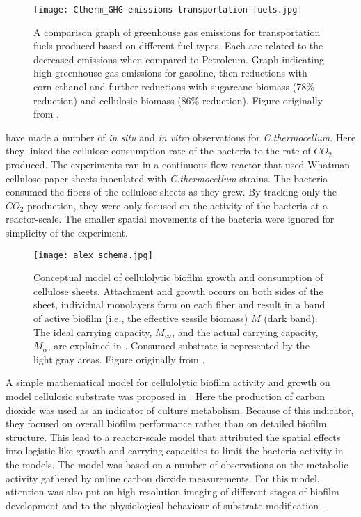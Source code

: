 \begin{figure}[!htp]
  \centering
  \texttt{[image: Ctherm\_GHG-emissions-transportation-fuels.jpg]}
  \caption{A comparison graph of greenhouse gas emissions for transportation fuels produced based on different fuel types.
    Each are related to the decreased emissions when compared to Petroleum.
    Graph indicating high greenhouse gas emissions for gasoline, then reductions with corn ethanol and further reductions with sugarcane biomass (78\% reduction) and cellulosic biomass (86\% reduction).
    Figure originally from \cite{afdc2007emission}.
  }
  \label{fig:emissions}
\end{figure}

\cite{dumitrache2015mathematicalModeling} have made a number of \textit{in situ} and \textit{in vitro} observations for \textit{C.thermocellum}.
Here they linked the cellulose consumption rate of the bacteria to the rate of $CO_2$ produced.
The experiments ran in a continuous-flow reactor that used Whatman cellulose paper sheets inoculated with \textit{C.thermocellum} strains.
The bacteria consumed the fibers of the cellulose sheets as they grew.
By tracking only the $CO_2$ production, they were only focused on the activity of the bacteria at a reactor-scale.
The smaller spatial movements of the bacteria were ignored for simplicity of the experiment.

\begin{figure}[!htpp]
  \centering
  \texttt{[image: alex\_schema.jpg]}
  \caption{Conceptual model of cellulolytic biofilm growth and consumption of cellulose sheets. 
    Attachment and growth occurs on both sides of the sheet, individual monolayers form on each fiber and result in a band of active biofilm (i.e., the effective sessile biomass) $M$ (dark band). 
    The ideal carrying capacity, $M_{\infty}$, and the actual carrying capacity, $M_{\alpha}$, are explained in \cite{dumitrache2015mathematicalModeling}.
    Consumed substrate is represented by the light gray areas.
    Figure originally from \cite{dumitrache2015mathematicalModeling}.
  }
  \label{fig:alex_schema}
\end{figure}

A simple mathematical model for cellulolytic biofilm activity and growth on model cellulosic substrate was proposed in \cite{dumitrache2015mathematicalModeling}. 
Here the production of carbon dioxide was used as an indicator of culture metabolism.
Because of this indicator, they focused on overall biofilm performance rather than on detailed biofilm structure.
This lead to a reactor-scale model that attributed the spatial effects into logistic-like growth and carrying capacities to limit the bacteria activity in the models.
The model was based on a number of observations on the metabolic activity gathered by online carbon dioxide measurements.
For this model, attention was also put on high-resolution imaging of different stages of biofilm development \citep{dumitrache2013formFunction} and to the physiological behaviour of substrate modification \citep{dumitrache2013tracking}.

